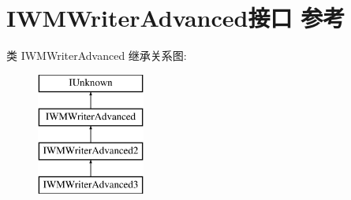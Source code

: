 \hypertarget{interface_i_w_m_writer_advanced}{}\section{I\+W\+M\+Writer\+Advanced接口 参考}
\label{interface_i_w_m_writer_advanced}
类 I\+W\+M\+Writer\+Advanced 继承关系图\+:\begin{figure}[H]
\begin{center}
\leavevmode
\includegraphics[height=4.000000cm]{interface_i_w_m_writer_advanced}
\end{center}
\end{figure}
